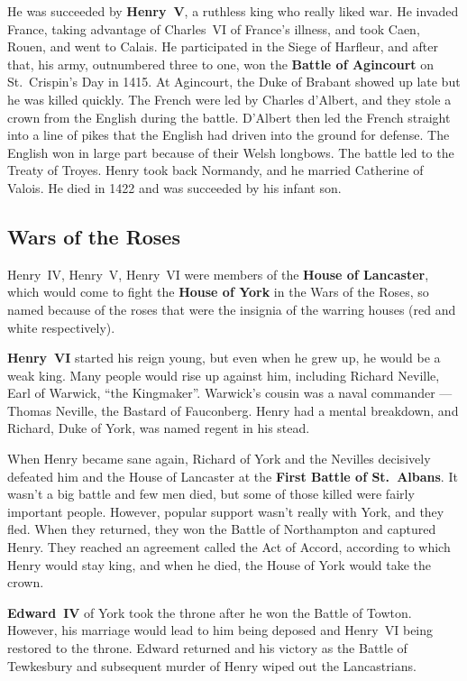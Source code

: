 He was succeeded by \textbf{Henry~V}, a ruthless king who really liked war.
He invaded France, taking advantage of Charles~VI of France's illness,
and took Caen, Rouen, and went to Calais.
He participated in the Siege of Harfleur, and after that,
his army, outnumbered three to one, won the \textbf{Battle of Agincourt} on St.\ Crispin's Day in 1415.
At Agincourt, the Duke of Brabant showed up late but he was killed quickly.
The French were led by Charles d'Albert, and they stole a crown from the English during the battle.
D'Albert then led the French straight into a line of pikes that the English had driven into the ground for defense.
The English won in large part because of their Welsh longbows.
The battle led to the Treaty of Troyes.
Henry took back Normandy, and he married Catherine of Valois.
He died in 1422 and was succeeded by his infant son.

\subsection*{Wars of the Roses}

Henry~IV, Henry~V, Henry~VI were members of the \textbf{House of Lancaster},
which would come to fight the \textbf{House of York} in the Wars of the Roses,
so named because of the roses that were the insignia of the warring houses (red and white respectively).

\textbf{Henry~VI} started his reign young, but even when he grew up, he would be a weak king.
Many people would rise up against him, including Richard Neville, Earl of Warwick, ``the Kingmaker''.
Warwick's cousin was a naval commander --- Thomas Neville, the Bastard of Fauconberg.
Henry had a mental breakdown, and Richard, Duke of York, was named regent in his stead.

When Henry became sane again, Richard of York and the Nevilles decisively defeated
him and the House of Lancaster at the \textbf{First Battle of St.\ Albans}.
It wasn't a big battle and few men died, but some of those killed were fairly important people.
However, popular support wasn't really with York, and they fled.
When they returned, they won the Battle of Northampton and captured Henry.
They reached an agreement called the Act of Accord, according to which Henry would stay king,
and when he died, the House of York would take the crown.

\textbf{Edward~IV} of York took the throne after he won the Battle of Towton.
However, his marriage would lead to him being deposed and Henry~VI being restored to the throne.
Edward returned and his victory as the Battle of Tewkesbury
and subsequent murder of Henry wiped out the Lancastrians.

